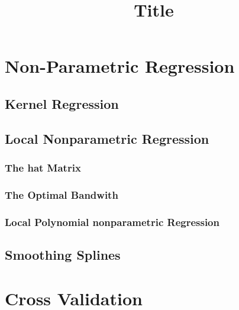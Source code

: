 \documentclass[
fourColumns,
landscape
]{formularyETH/formularyETH}
\title{Title}
\begin{document}

\section{Non-Parametric Regression}\label{sec:non-parametric_regression}
  
  \subsection{Kernel Regression}\label{subsec:local_regression}
  \subsection{Local Nonparametric Regression}\label{subsubsec:local_linear_regression}
    
    
    \subsubsection{The hat Matrix}\label{subsubsec:the_hat_matrix}
      
      \label{subsubsubsec:variance_estimates}
      
      \subsubsection{The Optimal Bandwith}\label{subsubsec:the_optimal_bandwith}
      
      \subsubsection{Local Polynomial nonparametric Regression}\label{subsubsec:local_polynomial_nonparametric_regression}
      
  \subsection{Smoothing Splines}\label{subsec:smoothing_splines}
    
\section{Cross Validation}\label{sec:cross_validation}
    
\end{document}

